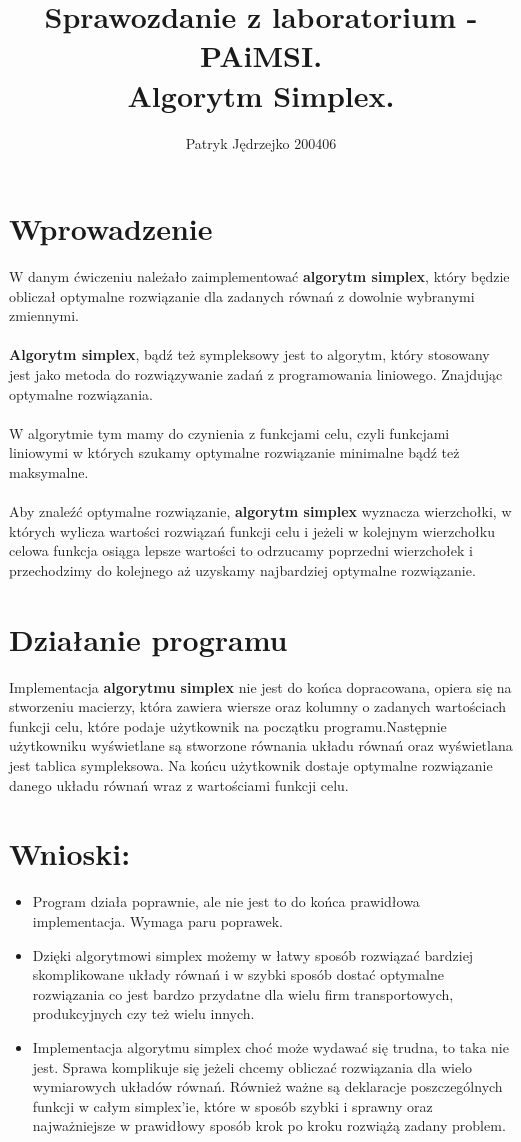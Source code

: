 \documentclass{article}
\author{Patryk Jędrzejko 200406}
\title{Sprawozdanie z laboratorium - PAiMSI. \\Algorytm Simplex.}
\begin{document}
\maketitle

\section{Wprowadzenie}
W danym ćwiczeniu należało zaimplementować \textbf{algorytm simplex}, który będzie obliczał optymalne rozwiązanie
dla zadanych równań z dowolnie wybranymi zmiennymi.
\\\\\textbf{Algorytm simplex}, bądź też sympleksowy jest to algorytm, który stosowany jest jako metoda do rozwiązywanie zadań z programowania liniowego. Znajdując optymalne rozwiązania. 
\\\\W algorytmie tym mamy do czynienia z funkcjami celu, czyli funkcjami liniowymi w których szukamy optymalne rozwiązanie minimalne bądź też maksymalne.
\\\\Aby znaleźć optymalne rozwiązanie, \textbf{algorytm simplex} wyznacza wierzchołki, w których wylicza wartości rozwiązań funkcji celu i jeżeli w kolejnym wierzchołku celowa funkcja osiąga lepsze wartości to odrzucamy poprzedni wierzchołek i przechodzimy do kolejnego aż uzyskamy najbardziej optymalne rozwiązanie.
\section{Działanie programu}
Implementacja \textbf{algorytmu \textbf{simplex}} nie jest do końca dopracowana, opiera się na stworzeniu macierzy, która zawiera wiersze oraz kolumny o zadanych wartościach funkcji celu, które podaje użytkownik na początku programu.Następnie
użytkowniku wyświetlane są stworzone równania układu równań oraz wyświetlana jest tablica sympleksowa. Na końcu użytkownik dostaje optymalne rozwiązanie danego układu równań wraz z wartościami funkcji celu.

\section{Wnioski:}
\begin{itemize}
  \item Program działa poprawnie, ale nie jest to do końca prawidłowa implementacja. Wymaga paru poprawek.
  \item Dzięki algorytmowi simplex możemy w łatwy sposób rozwiązać bardziej skomplikowane układy równań i w szybki sposób dostać optymalne rozwiązania co jest bardzo przydatne dla wielu firm transportowych, produkcyjnych czy też wielu innych.
  \item Implementacja algorytmu simplex choć może wydawać się trudna, to taka nie jest. Sprawa komplikuje się jeżeli chcemy obliczać rozwiązania dla wielo wymiarowych układów równań. Również ważne są deklaracje poszczególnych funkcji w całym simplex'ie, które w sposób szybki i sprawny oraz najważniejsze w prawidłowy sposób krok po kroku rozwiążą zadany problem.
\end{itemize}
\end{document}
